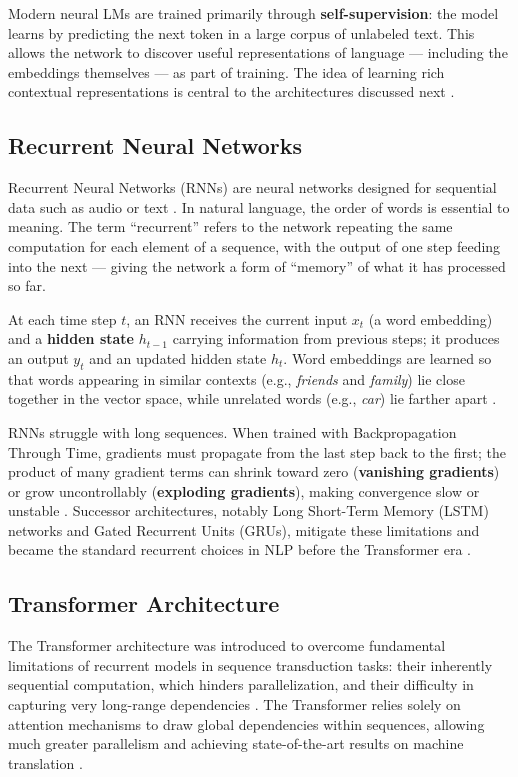 Modern neural LMs are trained primarily through \textbf{self-supervision}: the model learns by predicting the next token in a large corpus of unlabeled text. This allows the network to discover useful representations of language --- including the embeddings themselves --- as part of training. The idea of learning rich contextual representations is central to the architectures discussed next \cite{jm3_llm_book}.

\subsection{Recurrent Neural Networks}

Recurrent Neural Networks (RNNs) are neural networks designed for sequential data such as audio or text \cite{Elman1990FindingSI}. In natural language, the order of words is essential to meaning. The term ``recurrent'' refers to the network repeating the same computation for each element of a sequence, with the output of one step feeding into the next --- giving the network a form of ``memory'' of what it has processed so far.

At each time step $t$, an RNN receives the current input $x_t$ (a word embedding) and a \textbf{hidden state} $h_{t-1}$ carrying information from previous steps; it produces an output $y_t$ and an updated hidden state $h_t$. Word embeddings are learned so that words appearing in similar contexts (e.g., \textit{friends} and \textit{family}) lie close together in the vector space, while unrelated words (e.g., \textit{car}) lie farther apart \cite{jm3_llm_book}.

RNNs struggle with long sequences. When trained with Backpropagation Through Time, gradients must propagate from the last step back to the first; the product of many gradient terms can shrink toward zero (\textbf{vanishing gradients}) or grow uncontrollably (\textbf{exploding gradients}), making convergence slow or unstable \cite{jm3_llm_book}. Successor architectures, notably Long Short-Term Memory (LSTM) networks \cite{Hochreiter1997LongSM} and Gated Recurrent Units (GRUs), mitigate these limitations and became the standard recurrent choices in NLP before the Transformer era \cite{jm3_llm_book}.

\subsection{Transformer Architecture}

The Transformer architecture was introduced to overcome fundamental limitations of recurrent models in sequence transduction tasks: their inherently sequential computation, which hinders parallelization, and their difficulty in capturing very long-range dependencies \cite{vaswani2017_attention_is_all}. The Transformer relies solely on attention mechanisms to draw global dependencies within sequences, allowing much greater parallelism and achieving state-of-the-art results on machine translation \cite{jm3_llm_book, vaswani2017_attention_is_all}.

